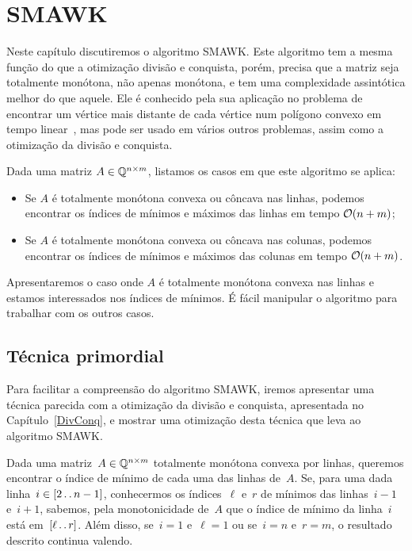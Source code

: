 \chapter{SMAWK}
\label{SMAWK}


Neste capítulo discutiremos o algoritmo SMAWK. Este algoritmo tem a mesma função do que a otimização divisão e conquista, porém, precisa que a matriz seja totalmente monótona, não apenas monótona, e tem uma complexidade assintótica melhor do que aquele. Ele é conhecido pela sua aplicação no problema de encontrar um vértice mais distante de cada vértice num polígono convexo em tempo linear~\cite{Aggarwal:1987}, mas pode ser usado em vários outros problemas, assim como a otimização da divisão e conquista.

Dada uma matriz $A \in \mathbb{Q}^{n \times m}$, listamos os casos em que este algoritmo se aplica:
\begin{itemize}
    \item Se $A$ é totalmente monótona convexa ou côncava nas linhas, podemos encontrar os índices de mínimos e máximos das linhas em tempo $\mathcal{O}(n + m)$;
    \item Se $A$ é totalmente monótona convexa ou côncava nas colunas, podemos encontrar os índices de mínimos e máximos das colunas em tempo $\mathcal{O}(n + m)$.
\end{itemize}

Apresentaremos o caso onde $A$ é totalmente monótona convexa nas linhas e estamos interessados nos índices de mínimos. É fácil manipular o algoritmo para trabalhar com os outros casos.


\section{Técnica primordial} \label{SMAWK:primordial}
Para facilitar a compreensão do algoritmo SMAWK, iremos apresentar uma técnica parecida com a otimização da divisão e conquista, apresentada no Capítulo~\ref{DivConq}, e mostrar uma otimização desta técnica que leva ao algoritmo SMAWK.

Dada uma matriz~$A \in \mathbb{Q}^{n \times m}$ totalmente monótona convexa por linhas, queremos encontrar o índice de mínimo de cada uma das linhas de~$A$. Se, para uma dada linha~${ i \in [2 \,.\,.\, n-1] }$, conhecermos os índices~$\ell$ e~$r$ de mínimos das linhas~${ i-1 }$ e~${ i+1 }$, sabemos, pela monotonicidade de~$A$ que o índice de mínimo da linha~$i$ está em~${ [\ell \,.\,.\, r] }$. Além disso, se~${ i = 1 }$ e~${ \ell = 1 }$ ou se~${ i = n }$ e~${ r = m }$, o resultado descrito continua valendo.

